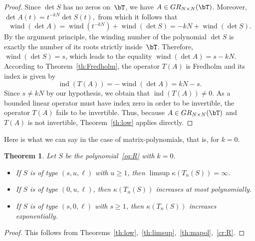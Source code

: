 \documentclass[addpoints,12pt,letter]{article}
\DeclareMathOperator{\ind}{ind}
\DeclareMathOperator{\wind}{wind}
\newcommand{\ka}{\kappa}
\newcommand{\nf}{\infty}
\newcommand{\SR}{S}
\renewcommand{\ge}{\geqslant}
\numberwithin{equation}{section}
\newtheorem{theorem}[lemma]{Theorem}
\theoremstyle{definition}
\begin{document}
\begin{proof}
Since $\det \SR$ has no zeros on~$\bT$, we have $A\in GR_{N\times N}(\bT)$.
Moreover, $ \det A(t)=t^{-kN}\det \SR(t), $ from which it follows that
\[
\wind(\det A)=\wind(t^{-kN})+\wind(\det \SR)=-kN+\wind(\det \SR).
\]
By the argument principle, the winding number of the polynomial $\det\SR$ is exactly the number of its roots strictly inside~$\bT$.
Therefore, $\wind(\det \SR)=s$, which leads to the equality $ \wind(\det A)=s-kN. $
According to Theorem~\ref{th:Fredholm}, the operator $T(A)$ is Fredholm and its index is given by
\[
\ind(T(A))=-\wind(\det A)=kN-s.
\]
Since $s\ne kN$ by our hypothesis, we obtain that $\ind(T(A))\ne 0$.
As a bounded linear operator must have index zero in order to be invertible, the operator $T(A)$ fails to be invertible.
Thus, because $A\in GR_{N\times N}(\bT)$ and $T(A)$ is not invertible, Theorem~\ref{th:low} applies directly.
\end{proof}

Here is what we can say in the case of matrix-polynomials, that is, for $k=0$.

\begin{theorem}\label{th:types}
Let $\SR$ be the polynomial~\eqref{eq:R} with $k=0$.
\begin{itemize}
\item If $\SR$ is of type $(s,u,\ell)$ with $u\ge 1$, then $\limsup \ka(T_{n}(\SR))=\nf$.
\item If $\SR$ is of type $(0,u,\ell)$, then $\ka(T_{n}(\SR))$ increases at most polynomially.
\item If $\SR$ is of type $(s,0,\ell)$ with $s\ge 1$, then $\ka(T_{n}(\SR))$ increases exponentially.
\end{itemize}
\end{theorem}

\begin{proof} This follows from Theorems~\ref{th:low},~\ref{th:limsup},~\ref{th:mapol},~\ref{cr:R}.
\end{proof}
\end{document}
